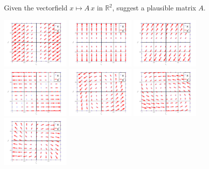 \documentclass[12pt,a4paper]{article}
\newcommand{\IR}{\mathbb{R}}
\begin{document}
    
    \subsection{}
    
    Given the vectorfield $x \mapsto A \, x$ in $\IR^2$,
    suggest a plausible matrix $A$.
    
    \includegraphics[width=0.25\textwidth]{A/2.png}
    \includegraphics[width=0.25\textwidth]{A/3.png}
    \includegraphics[width=0.25\textwidth]{A/6.png}
    \includegraphics[width=0.25\textwidth]{A/15.png}
    \includegraphics[width=0.25\textwidth]{A/8.png}
    \includegraphics[width=0.25\textwidth]{A/11.png}
    \includegraphics[width=0.25\textwidth]{A/12.png}
\end{document}
